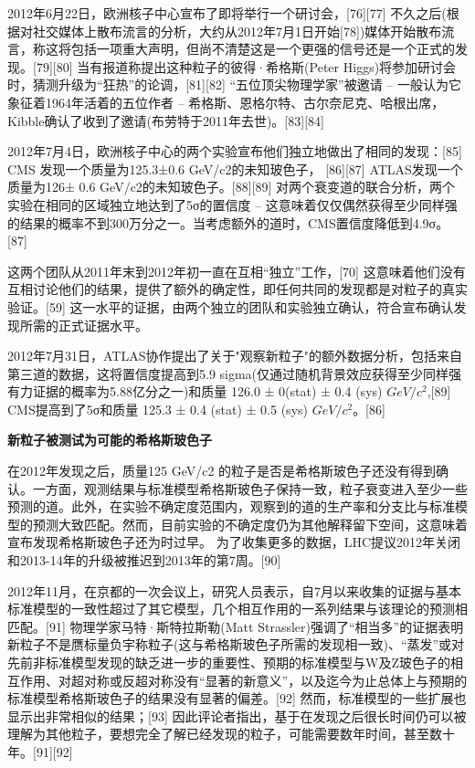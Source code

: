 2012年6月22日，欧洲核子中心宣布了即将举行一个研讨会，[76][77] 不久之后(根据对社交媒体上散布流言的分析，大约从2012年7月1日开始[78])媒体开始散布流言，称这将包括一项重大声明，但尚不清楚这是一个更强的信号还是一个正式的发现。[79][80] 当有报道称提出这种粒子的彼得·希格斯(Peter Higgs)将参加研讨会时，猜测升级为“狂热”的论调，[81][82] “五位顶尖物理学家”被邀请 – 一般认为它象征着1964年活着的五位作者 – 希格斯、恩格尔特、古尔奈尼克、哈根出席，Kibble确认了收到了邀请(布劳特于2011年去世)。[83][84]

2012年7月4日，欧洲核子中心的两个实验宣布他们独立地做出了相同的发现：[85] CMS 发现一个质量为125.3±0.6 GeV/c2的未知玻色子， [86][87] ATLAS发现一个质量为126± 0.6 GeV/c2的未知玻色子。[88][89] 对两个衰变道的联合分析，两个实验在相同的区域独立地达到了5σ的置信度 – 这意味着仅仅偶然获得至少同样强的结果的概率不到300万分之一。当考虑额外的道时，CMS置信度降低到4.9σ。[87]

这两个团队从2011年末到2012年初一直在互相“独立”工作，[70] 这意味着他们没有互相讨论他们的结果，提供了额外的确定性，即任何共同的发现都是对粒子的真实验证。[59] 这一水平的证据，由两个独立的团队和实验独立确认，符合宣布确认发现所需的正式证据水平。

2012年7月31日，ATLAS协作提出了关于"观察新粒子"的额外数据分析，包括来自第三道的数据，这将置信度提高到5.9 sigma(仅通过随机背景效应获得至少同样强有力证据的概率为5.88亿分之一)和质量 126.0 ± 0(stat) ± 0.4 (sys) $GeV/c^{2}$,[89] CMS提高到了5σ和质量 125.3 ± 0.4 (stat) ± 0.5 (sys) $GeV/c^{2}$。[86]

\textbf{新粒子被测试为可能的希格斯玻色子}

在2012年发现之后，质量125 GeV/c2 的粒子是否是希格斯玻色子还没有得到确认。一方面，观测结果与标准模型希格斯玻色子保持一致，粒子衰变进入至少一些预测的道。此外，在实验不确定度范围内，观察到的道的生产率和分支比与标准模型的预测大致匹配。然而，目前实验的不确定度仍为其他解释留下空间，这意味着宣布发现希格斯玻色子还为时过早。 为了收集更多的数据，LHC提议2012年关闭和2013-14年的升级被推迟到2013年的第7周。[90]

2012年11月，在京都的一次会议上，研究人员表示，自7月以来收集的证据与基本标准模型的一致性超过了其它模型，几个相互作用的一系列结果与该理论的预测相匹配。[91] 物理学家马特·斯特拉斯勒(Matt Strassler)强调了“相当多”的证据表明新粒子不是赝标量负宇称粒子(这与希格斯玻色子所需的发现相一致)、“蒸发”或对先前非标准模型发现的缺乏进一步的重要性、预期的标准模型与W及Z玻色子的相互作用、对超对称或反超对称没有“显著的新意义”，以及迄今为止总体上与预期的标准模型希格斯玻色子的结果没有显著的偏差。[92] 然而，标准模型的一些扩展也显示出非常相似的结果；[93] 因此评论者指出，基于在发现之后很长时间仍可以被理解为其他粒子，要想完全了解已经发现的粒子，可能需要数年时间，甚至数十年。[91][92]

